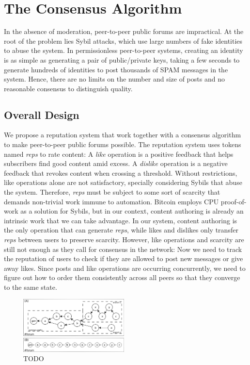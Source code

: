 \documentclass[10pt,journal,compsoc]{IEEEtran}
\newcommand{\reps} {\emph{reps}\xspace}
\begin{document}
\section{The Consensus Algorithm}
\label{sec.consensus}

In the absence of moderation, peer-to-peer public forums are impractical.
At the root of the problem lies Sybil attacks, which use large numbers of fake
identities to abuse the system.
In permissionless peer-to-peer systems, creating an identity is as simple as
generating a pair of public/private keys, taking a few seconds to generate
hundreds of identities to post thousands of SPAM messages in the system.
Hence, there are no limits on the number and size of posts and no reasonable
consensus to distinguish quality.

\subsection{Overall Design}

We propose a reputation system that work together with a consensus algorithm to
make peer-to-peer public forums possible.
%
The reputation system uses tokens named \reps to rate content:
A \emph{like} operation is a positive feedback that helps subscribers find good
content amid excess.
A \emph{dislike} operation is a negative feedback that revokes content when
crossing a threshold.
%
Without restrictions, like operations alone are not satisfactory, specially
considering Sybils that abuse the system.
Therefore, \reps must be subject to some sort of scarcity that demands
non-trivial work immune to automation.
Bitcoin employs CPU proof-of-work as a solution for Sybils, but in our context,
content authoring is already an intrinsic work that we can take advantage.
In our system, content authoring is the only operation that can generate \reps,
while likes and dislikes only transfer \reps between users to preserve
scarcity.
%
However, like operations and scarcity are still not enough as they call for
consensus in the network:
Now we need to track the reputation of users to check if they are allowed to
post new messages or give away likes.
Since posts and like operations are occurring concurrently, we need to figure
out how to order them consistently across all peers so that they converge to
the same state.

\begin{figure}[t]
\centering
\includegraphics[width=0.49\textwidth]{reps2.png}
\caption{TODO}
\label{fig.reps}
\end{figure}
\end{document}
